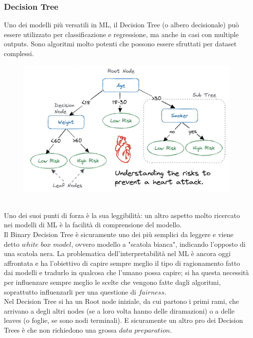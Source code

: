 \subsubsection{Decision Tree}
Uno dei modelli più versatili in ML, il Decision Tree (o albero decisionale) può essere utilizzato per classificazione e regressione, ma anche in casi con multiple outputs. Sono algoritmi molto potenti che possono essere sfruttati per dataset complessi. 
\\
\begin{figure}[th]
    \centering
    \includegraphics[scale=0.5]{ML/img/decision tree.png}
\end{figure}
\\
Uno dei suoi punti di forza è la sua leggibilità: un altro aspetto molto ricercato nei modelli di ML è la facilità di comprensione del modello.
\\
Il Binary Decision Tree è sicuramente uno dei più semplici da leggere e viene detto $white$ $box$ $model$, ovvero modello a "scatola bianca", indicando l'opposto di una scatola nera. La problematica dell'interpretabilità nel ML è ancora oggi affrontata e ha l'obiettivo di capire sempre meglio il tipo di ragionamento fatto dai modelli e tradurlo in qualcosa che l'umano possa capire; si ha questa necessità per influenzare sempre meglio le scelte che vengono fatte dagli algoritmi, soprattutto influenzarli per una questione di $fairness$.
\\
Nel Decision Tree si ha un Root node iniziale, da cui partono i primi rami, che arrivano a degli altri nodes (se a loro volta hanno delle diramazioni) o a delle leaves (o foglie, se sono nodi terminali). E sicuramente un altro pro dei Decision Trees è che non richiedono una grossa $data$ $preparation$.
\\
